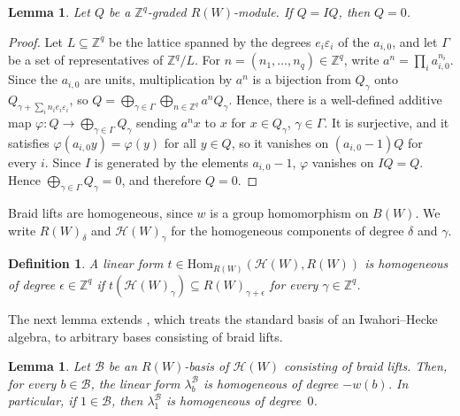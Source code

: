\documentclass[11pt, reqno]{amsart}
\numberwithin{equation}{section}
\newtheorem{lemma}[theorem]{Lemma}
\newtheorem{definition}[theorem]{Definition}
\theoremstyle{remark}
\begin{document}
\begin{lemma}\label{lem:gradedNak}
Let $Q$ be a $\mathbb Z^q$-graded $R(W)$-module. If $Q=IQ$, then $Q=0$.
\end{lemma}

\begin{proof}
Let $L\subseteq\mathbb Z^q$ be the lattice spanned by the degrees
$e_i\varepsilon_i$ of the $a_{i,0}$, and let $\Gamma$ be a set of
representatives of $\mathbb Z^q/L$. For
$n=(n_1,\dots,n_q)\in\mathbb Z^q$, write $a^n=\prod_ia_{i,0}^{n_i}$.
Since the $a_{i,0}$ are units, multiplication by $a^n$ is a bijection
from $Q_\gamma$ onto $Q_{\gamma+\sum_in_ie_i\varepsilon_i}$, so
$Q=\bigoplus_{\gamma\in\Gamma}\bigoplus_{n\in\mathbb Z^q}a^nQ_\gamma$.
Hence, there is a well-defined additive map
$\varphi\colon Q\to\bigoplus_{\gamma\in\Gamma}Q_\gamma$ sending $a^nx$
to $x$ for $x\in Q_\gamma$, $\gamma\in\Gamma$. It is surjective, and it
satisfies $\varphi(a_{i,0}y)=\varphi(y)$ for all $y\in Q$, so it
vanishes on $(a_{i,0}-1)Q$ for every $i$. Since $I$ is generated by the
elements $a_{i,0}-1$, $\varphi$ vanishes on $IQ=Q$. Hence
$\bigoplus_{\gamma\in\Gamma}Q_\gamma=0$, and therefore $Q=0$.
\end{proof}



Braid lifts are homogeneous, since $w$ is a group homomorphism on
$B(W)$. We write $R(W)_\delta$ and $\mathcal H(W)_\gamma$ for the
homogeneous components of degree $\delta$ and $\gamma$.

\begin{definition}{\rm
A linear form $t \in\mathrm{Hom}_{R(W)}(\mathcal H(W),R(W))$ is
\emph{homogeneous of degree $\epsilon\in\mathbb Z^q$} if
$t(\mathcal H(W)_\gamma)\subseteq R(W)_{\gamma+\epsilon}$ for
every $\gamma\in\mathbb Z^q$.}
\end{definition}

The next lemma extends \cite[Lemma~2.4]{BMM}, which treats the standard
basis of an Iwahori--Hecke algebra, to arbitrary bases consisting of
braid lifts.


\begin{lemma}\label{exp}
Let $\mathcal B$ be an $R(W)$-basis of $\mathcal H(W)$ consisting of
braid lifts. Then, for every $b\in\mathcal B$, the linear form
$\lambda^{\mathcal B}_b$ is homogeneous of degree $-w(b)$. In
particular, if $1\in\mathcal B$, then $\lambda^{\mathcal B}_1$ is
homogeneous of degree~$0$.
\end{lemma}
\end{document}

